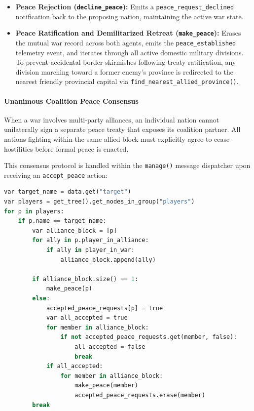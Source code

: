 \begin{itemize}
    \item \textbf{Peace Rejection (\texttt{decline\_peace}):} Emits a \texttt{peace\_request\_declined} notification back to the proposing nation, maintaining the active war state.
    \item \textbf{Peace Ratification and Demilitarized Retreat (\texttt{make\_peace}):} Erases the mutual war record across both agents, emits the \texttt{peace\_established} telemetry event, and iterates through all active domestic military divisions. To prevent accidental border skirmishes following treaty ratification, any division marching toward a former enemy's province is redirected to the nearest friendly provincial capital via \texttt{find\_nearest\_allied\_province()}.
\end{itemize}

\paragraph{Unanimous Coalition Peace Consensus}
When a war involves multi-party alliances, an individual nation cannot unilaterally sign a separate peace treaty that exposes its coalition partner. All nations fighting within the same allied block must explicitly agree to cease hostilities before formal peace is enacted.

This consensus protocol is handled within the \texttt{manage()} message dispatcher upon receiving an \texttt{accept\_peace} action:

\begin{lstlisting}[language=python, caption={Coalition consensus peace evaluation in Agent.gd.}, label={lst:coalition_peace}]
var target_name = data.get("target")
var players = get_tree().get_nodes_in_group("players")
for p in players:
    if p.name == target_name:
        var alliance_block = [p]
        for ally in p.player_in_alliance:
            if ally in player_in_war:
                alliance_block.append(ally)
        
        if alliance_block.size() == 1:
            make_peace(p)
        else:
            accepted_peace_requests[p] = true
            var all_accepted = true
            for member in alliance_block:
                if not accepted_peace_requests.get(member, false):
                    all_accepted = false
                    break
            if all_accepted:
                for member in alliance_block:
                    make_peace(member)
                    accepted_peace_requests.erase(member)
        break
\end{lstlisting}

